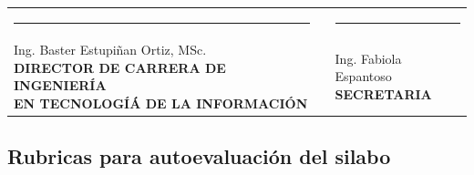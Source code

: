 \documentclass[a4paper,12pt,spanish]{article}
\begin{document}
\vspace{3cm}
\begin{center}

\begin{tabular}[H]{m{8cm}lm{8cm}}
  
  \rule{7cm}{0.4pt}&  &\rule{7cm}{0.4pt} \\
  \makecell[c]{Ing. Baster Estupiñan Ortiz, MSc. \\ \textbf{DIRECTOR DE CARRERA DE INGENIERÍA} \\ \textbf{EN TECNOLOGÍÁ DE LA INFORMACIÓN}} & & \makecell[c]{Ing. Fabiola Espantoso \\ \textbf{SECRETARIA}} 
\end{tabular}
\end{center}





\subsection{Rubricas para autoevaluación del silabo}
\label{sec:rubr-para-aprob}
\end{document}
